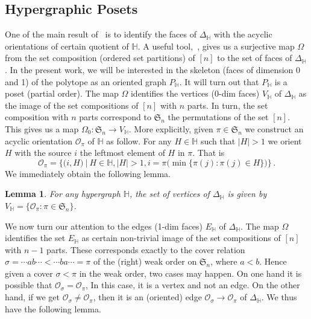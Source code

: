 \documentclass[reqno]{amsart}
\newtheorem{lemma}[theorem]{Lemma}
\theoremstyle{definition}
\newcommand{\fS}{\mathfrak{S}} %
\newcommand{\Or}{\mathcal O}  %
\newcommand{\HH}{\mathbb H}  %
\begin{document}
\subsection{Hypergraphic Posets} 
\label{subsec:P_H}
One of the main result of~\cite[Thm 3.18]{BenBerMac} is to identify the faces of $\Delta_\HH$ with the acyclic orientations of certain quotient of $\HH$.  A useful tool,~\cite[Lem 2.9]{BenBerMac}, gives us a surjective map $\Omega$ from the set composition (ordered set partitions) of $[n]$ to the set of faces of $\Delta_\HH$. 
 In the present work, we will be interested in the skeleton (faces of dimension 0 and 1)
of the polytope as an oriented graph $P_{\HH}$. It will turn out that $P_{\HH}$ is a poset (partial order).  The map $\Omega$ identifies the vertices (0-dim faces) $V_{\HH}$  of $\Delta_{\HH}$ as the image of the set compositions of $[n]$ with $n$ parts. In turn, the set composition with $n$ parts correspond to $\fS_n$ the permutations of the set $[n]$. This gives us a map $\Omega_0 \colon \fS_n \to V_{\HH}$.
More explicitly, given $\pi\in\fS_n$ we construct an acyclic orientation $\Or_\pi$ of $\HH$ as follow. For any $H\in \HH$ such that $|H|>1$ we orient $H$  with the source $i$  the leftmost element of $H$ in $\pi$. That is
\begin{equation}\label{eq:orientation}
	\Or_\pi = \Big\{\big(i,H\big)\ \big| \ H\in \HH, |H|>1,  i=\pi\big(\min\{\pi(j): \pi(j)\in H\}\big)\Big\}\,.
\end{equation}
We immediately obtain the following lemma.

\begin{lemma}\label{lem:Hvertices}
For any hypergraph $\HH$, the set of vertices of $\Delta_{\HH}$ is given by $V_{\HH}=\{\Or_\pi: \pi\in \fS_n\}$.
\end{lemma}

We now turn our attention to the edges (1-dim faces) $E_{\HH}$ of $\Delta_{\HH}$. The map $\Omega$ identifies the set $E_{\HH}$ as certain non-trivial image of the set compositions of $[n]$ with $n-1$ parts.
These corresponds  exactly to the cover relation $\sigma=\cdots ab \cdots < \cdots ba\cdots =\pi$ of the (right) weak order on $\fS_n$, where $a<b$. 
Hence given a cover $\sigma < \pi$ in the weak  order, two cases may happen. On one hand it is possible that $\Or_\sigma=\Or_\pi$, In this case, it is a vertex and not an edge. On the other hand, if we get 
 $\Or_\sigma\ne \Or_\pi$, then it is an (oriented) edge $\Or_\sigma\to\Or_\pi$ of $\Delta_{\HH}$. We thus have the following lemma.
\end{document}
